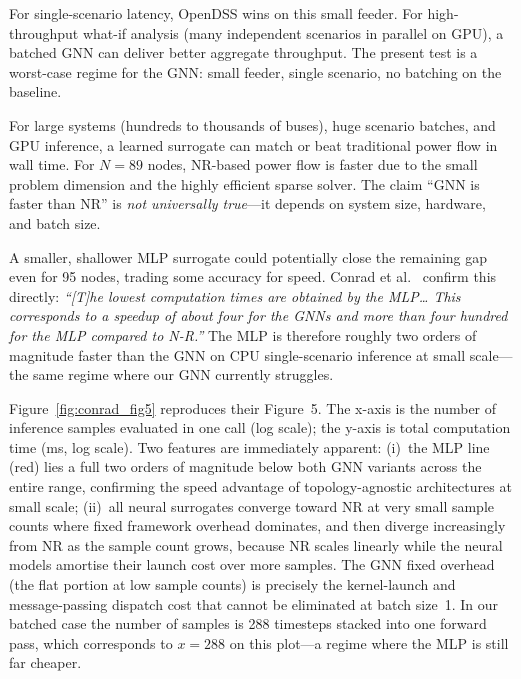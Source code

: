 \documentclass[11pt]{article}
\begin{document}
\begin{description}[style=unboxed, leftmargin=0pt, labelwidth=0pt]
  \item[\textbf{Latency vs.\ throughput.}]
  For single-scenario latency, OpenDSS wins on this small feeder.  For high-throughput
  what-if analysis (many independent scenarios in parallel on GPU), a batched GNN can
  deliver better aggregate throughput.  The present test is a worst-case regime for the
  GNN: small feeder, single scenario, no batching on the baseline.

  \item[\textbf{When does a GNN outperform Newton--Raphson power flow?}]
  For large systems (hundreds to thousands of buses), huge scenario batches, and GPU
  inference, a learned surrogate can match or beat traditional power flow in wall time.
  For $N = 89$ nodes, NR-based power flow is faster due to the small problem dimension
  and the highly efficient sparse solver.  The claim ``GNN is faster than NR'' is
  \emph{not universally true}---it depends on system size, hardware, and batch size.

  \item[\textbf{MLP vs.\ GNN trade-off: speed.}]
  A smaller, shallower MLP surrogate could potentially close the remaining gap even for
  95 nodes, trading some accuracy for speed.  Conrad et al.~\cite{Conrad2026} confirm
  this directly: \textit{``[T]he lowest computation times are obtained by the MLP\ldots
  This corresponds to a speedup of about four for the GNNs and more than four hundred
  for the MLP compared to N-R.''}  The MLP is therefore roughly two orders of magnitude
  faster than the GNN on CPU single-scenario inference at small scale---the same regime
  where our GNN currently struggles.

  Figure~\ref{fig:conrad_fig5} reproduces their Figure~5. The x-axis is the number of
  inference samples evaluated in one call (log scale); the y-axis is total computation
  time (ms, log scale).  Two features are immediately apparent: (i)~the MLP line
  (red) lies a full two orders of magnitude below both GNN variants across the entire
  range, confirming the speed advantage of topology-agnostic architectures at small
  scale; (ii)~all neural surrogates converge toward NR at very small sample counts
  where fixed framework overhead dominates, and then diverge increasingly from NR
  as the sample count grows, because NR scales linearly while the neural models
  amortise their launch cost over more samples.  The GNN fixed overhead
  (the flat portion at low sample counts) is precisely the kernel-launch and
  message-passing dispatch cost that cannot be eliminated at batch size~1.
  In our batched case the number of samples is 288 timesteps stacked into one
  forward pass, which corresponds to $x = 288$ on this plot---a regime where
  the MLP is still far cheaper.


\end{description}
\end{document}
